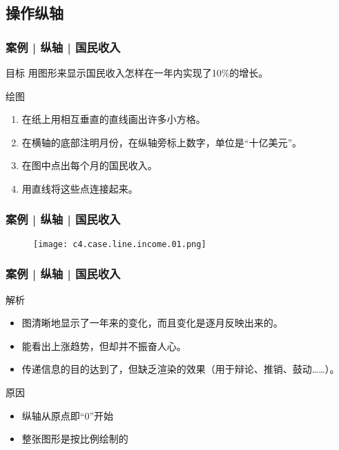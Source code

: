 \subsection{操作纵轴}
\begin{frame}
  \frametitle{案例 | 纵轴 | 国民收入}
  \begin{block}{目标}
    用图形来显示国民收入怎样在一年内实现了10\%的增长。
  \end{block}
  \pause
  \begin{block}{绘图}
    \begin{enumerate}
      \item 在纸上用相互垂直的直线画出许多小方格。
      \item 在横轴的底部注明月份，在纵轴旁标上数字，单位是“十亿美元”。
      \item 在图中点出每个月的国民收入。
      \item 用直线将这些点连接起来。
    \end{enumerate}
  \end{block}
\end{frame}

\begin{frame}
  \frametitle{案例 | 纵轴 | 国民收入}
  \begin{figure}
    \centering
    \texttt{[image: c4.case.line.income.01.png]}
  \end{figure}
\end{frame}

\begin{frame}
  \frametitle{案例 | 纵轴 | 国民收入}
  \begin{block}{解析}
    \begin{itemize}
      \item 图清晰地显示了一年来的变化，而且变化是逐月反映出来的。
      \item 能看出上涨趋势，但却并不振奋人心。
      \item 传递信息的目的达到了，但缺乏渲染的效果（用于辩论、推销、鼓动……）。
    \end{itemize}
  \end{block}
  \pause
  \begin{block}{原因}
    \begin{itemize}
      \item 纵轴从原点即“0”开始
      \item 整张图形是按比例绘制的
    \end{itemize}
  \end{block}
\end{frame}

